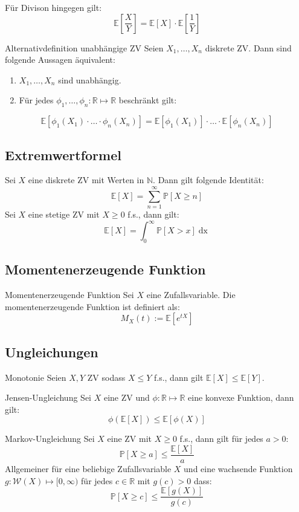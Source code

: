 \documentclass[a4paper,10pt]{article}
\def\R{\mathbb{R}}
\def\P{\mathbb{P}}
\def\E{\mathbb{E}}
\begin{document}
Für Divison hingegen gilt:
\[\E[\frac{X}{Y}] = \E[X] \cdot \E[\frac{1}{Y}]\]

\begin{subbox}{Alternativdefinition unabhängige ZV}
	Seien \(X_1, \ldots, X_n\) diskrete ZV. Dann sind folgende Aussagen äquivalent:
	\begin{enumerate}
		\item \(X_1, \ldots, X_n\) sind unabhängig.
		\item Für jedes \(\phi_1, \ldots, \phi_n: \R \mapsto\R\) beschränkt gilt:
	\end{enumerate}
	\[\E[\phi_1(X_1)\cdot\ldots\cdot\phi_n(X_n)] = \E[\phi_1(X_1)] \cdot\ldots\cdot \E[\phi_n(X_n)]\]
\end{subbox}

\subsection{Extremwertformel}
Sei \(X\) eine diskrete ZV mit Werten in \(\mathbb{N}\). Dann gilt folgende Identität:
\[\E[X] = \sum_{n=1}^\infty \P[X\ge n]\]
Sei \(X\) eine stetige ZV mit \(X \ge 0\) f.s., dann gilt:
\[\E[X] = \int_0^\infty \P[X > x] \mathop{dx}\]

\subsection{Momentenerzeugende Funktion}

\begin{subbox}{Momentenerzeugende Funktion}
	Sei $X$ eine Zufallsvariable. Die momentenerzeugende Funktion ist definiert als:
	$$
		M_X(t) := \E \left[ e^{tX} \right]
	$$
\end{subbox}

\subsection{Ungleichungen}
\begin{subbox}{Monotonie}
	Seien \(X, Y\) ZV sodass \(X \le Y\) f.s., dann gilt \(\E[X] \le \E[Y]\).
\end{subbox}

\begin{subbox}{Jensen-Ungleichung}
	Sei \(X\) eine ZV und \(\phi : \R \mapsto \R\) eine konvexe Funktion, dann gilt:
	\[\phi(\E[X]) \le \E[\phi(X)]\]
\end{subbox}

\begin{mainbox}{Markov-Ungleichung}
	Sei \(X\) eine ZV mit \(X \ge 0\) f.s., dann gilt für jedes \(a > 0\):
	\[\P[X\ge a] \le \frac{\E[X]}{a}\]
	Allgemeiner für eine beliebige Zufallsvariable $X$ und eine wachsende Funktion $g: \mathcal{W}(X) \mapsto [0, \infty)$ für jedes $c \in \R$ mit $g(c) > 0$ dass:
	$$\P[X \geq c] \leq \frac{\E[g(X)]}{g(c)}$$
\end{mainbox}
\end{document}
